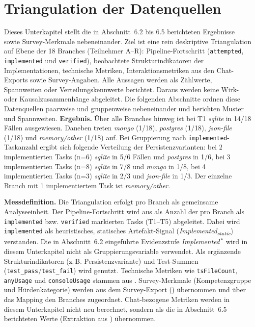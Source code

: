 \section{Triangulation der Datenquellen}
\label{sec:results_triangulation}

Dieses Unterkapitel stellt die in Abschnitt~6.2 bis 6.5 berichteten Ergebnisse sowie Survey-Merkmale nebeneinander.
Ziel ist eine rein deskriptive Triangulation auf Ebene der 18 Branches (Teilnehmer A--R): Pipeline-Fortschritt (\texttt{attempted}, \texttt{implemented} und \texttt{verified}), beobachtete Strukturindikatoren der Implementationen, technische Metriken, Interaktionsmetriken aus den Chat-Exports sowie Survey-Angaben.
Alle Aussagen werden als Zählwerte, Spannweiten oder Verteilungskennwerte berichtet. Daraus werden keine Wirk- oder Kausalzusammenhänge abgeleitet.
Die folgenden Abschnitte ordnen diese Datenquellen paarweise und gruppenweise nebeneinander und berichten Muster und Spannweiten.
{
\bfseries Ergebnis.} Über alle Branches hinweg ist bei T1 \emph{sqlite} in 14/18 Fällen ausgewiesen. Daneben treten \emph{mongo} (1/18), \emph{postgres} (1/18), \emph{json-file} (1/18) und \emph{memory/other} (1/18) auf.
Bei Gruppierung nach \texttt{implemented}-Taskanzahl ergibt sich folgende Verteilung der Persistenzvarianten: bei 2 implementierten Tasks (n=6) \emph{sqlite} in 5/6 Fällen und \emph{postgres} in 1/6, bei 3 implementierten Tasks (n=8) \emph{sqlite} in 7/8 und \emph{mongo} in 1/8, bei 4 implementierten Tasks (n=3) \emph{sqlite} in 2/3 und \emph{json-file} in 1/3. Der einzelne Branch mit 1 implementiertem Task ist \emph{memory/other}.

\begin{sloppypar}
{\bfseries Messdefinition.} Die Triangulation erfolgt pro Branch als gemeinsame Analyseeinheit.
Der Pipeline-Fortschritt wird aus  als Anzahl der pro Branch als \texttt{implemented} bzw. \texttt{verified} markierten Tasks (T1--T5) abgeleitet.
Dabei wird \texttt{implemented} als heuristisches, statisches Artefakt-Signal (\textit{Implemented\textsubscript{static}}) verstanden.
Die in Abschnitt~6.2 eingeführte Evidenzstufe  \textit{Implemented}\,$^\ast$ wird in diesem Unterkapitel nicht als Gruppierungsvariable verwendet.
Als ergänzende Strukturindikatoren (z.\,B. Persistenzvariante) und Test-Summen (\texttt{test\_pass}/\texttt{test\_fail}) wird  genutzt.
Technische Metriken wie \texttt{tsFileCount}, \texttt{anyUsage} und \texttt{consoleUsage} stammen aus .
Survey-Merkmale (Kompetenzgruppe und Hürdenkategorie) werden aus dem Survey-Export () übernommen und über das Mapping  den Branches zugeordnet.
Chat-bezogene Metriken werden in diesem Unterkapitel nicht neu berechnet, sondern als die in Abschnitt~6.5 berichteten Werte (Extraktion aus ) übernommen.
\end{sloppypar}

